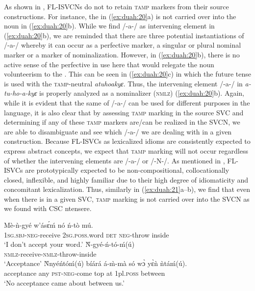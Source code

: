\documentclass[output=paper]{../langsci/langscibook}
\begin{document}
As shown in , FL-ISVCNs do not to retain \textsc{tamp} markers from their source constructions. For instance, the  in (\ref{ex:duah:20}a) is not carried over into the noun in (\ref{ex:duah:20}b). While we find /-a-/ as intervening element in (\ref{ex:duah:20}b), we are reminded that there are three potential instantiations of /-a-/ whereby it can occur as a perfective marker, a singular or plural nominal marker or a marker of nominalization. However, in (\ref{ex:duah:20}b), there is no active sense of the perfective in use here that would relegate the noun volunteerism to the . This can be seen in (\ref{ex:duah:20}c) in which the future tense is used with the \textsc{tamp}-neutral \textit{atuhoakyɛ}. Thus, the intervening element /-a-/ in \textit{a-tu-ho-a-kyɛ} is properly analyzed as a nominalizer (\textsc{nmlz}) (\ref{ex:duah:20}b). Again, while it is evident that the same  of /-a-/ can be used for different purposes in the language, it is also clear that by assessing \textsc{tamp} marking in the source SVC and determining if any of these \textsc{tamp} markers are/can be realized in the SVCN, we are able to disambiguate and see which /-a-/ we are dealing with in a given construction. Because FL-ISVCs as lexicalized idioms are consistently expected to express abstract concepts, we expect that \textsc{tamp} marking will not occur regardless of whether the intervening elements are /-a-/ or /-N-/. As mentioned in , FL-ISVCs are prototypically expected to be non-compositional, collocationally closed, inflexible, and highly familiar due to their high degree of idiomaticity and concomitant lexicalization. Thus, similarly in (\ref{ex:duah:21}a--b), we find that even when there is  in a given SVC, \textsc{tamp} marking is not carried over into the SVCN as we found with CSC ntensere.

\ea\label{ex:duah:21}
\ea\label{ex:duah:21a}
\gll Mè-ǹ-gyé w’ásɛ́ḿ nó ń-tò mú.\\
1\textsc{sg}.\textsc{sbj}-\textsc{neg}-receive	2\textsc{sg}.\textsc{poss}.word \textsc{det}	\textsc{neg}-throw inside\\
\glt `I don’t accept your word.'
\ex\label{ex:duah:21b}
\gll Ǹ-gyé-ń-tó-ḿ(ú)\\
\textsc{nmlz}-receive-\textsc{nmlz}-throw-inside\\
\glt `Acceptance'
\ex\label{ex:duah:21c}
\gll Ǹnyéńtóḿ(ú)	bíárá á-m̀-mà só wɔ̀ yɛ̀ǹ ǹtáḿ(ú).\\
acceptance any \textsc{pst}-\textsc{neg}-come top at 1pl.\textsc{poss} between\\
\glt `No acceptance came about between us.'
\z
\z
\end{document}

